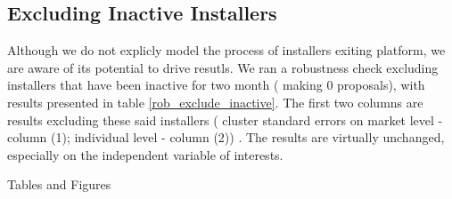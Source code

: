 \documentclass[msom,blindrev]{informs3}
\begin{document}
\subsection{Excluding Inactive Installers}
Although we do not explicly model the process of installers exiting platform, we are aware of its potential to drive resutls. We ran a robustness check excluding installers that have been inactive for two month ( making 0 proposals), with results presented in table \ref{rob_exclude_inactive}. The first two columns are results excluding these said installers ( cluster standard errors on market level - column (1); individual level - column (2)) . The results are virtually unchanged, especially on the independent variable of interests.

\clearpage
\begin{APPENDIX}{Tables and Figures}




\end{APPENDIX}
\clearpage
%
%
%











\end{document}
